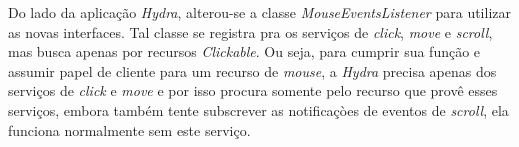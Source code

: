 Do lado da aplicação \emph{Hydra}, alterou-se a classe \emph{MouseEventsListener} para utilizar as novas interfaces. Tal classe se registra pra os serviços de \emph{click}, \emph{move} e \emph{scroll}, mas busca apenas por recursos \emph{Clickable}. Ou seja, para cumprir sua função e assumir papel de cliente para um recurso de \emph{mouse}, a \emph{Hydra} precisa apenas dos serviços de \emph{click} e \emph{move} e por isso procura somente pelo recurso que provê esses serviços, embora também tente subscrever as notificaçòes de eventos de \emph{scroll}, ela funciona normalmente sem este serviço.
 
